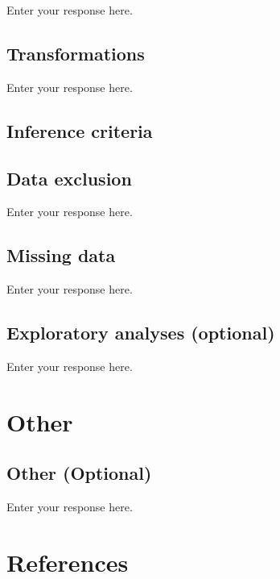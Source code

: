 \documentclass[]{article}
\begin{document}
Enter your response here.

\subsection{Transformations}\label{transformations}

Enter your response here.

\subsection{Inference criteria}\label{inference-criteria}

\subsection{Data exclusion}\label{data-exclusion}

Enter your response here.

\subsection{Missing data}\label{missing-data}

Enter your response here.

\subsection{Exploratory analyses
(optional)}\label{exploratory-analyses-optional}

Enter your response here.

\section{Other}\label{other}

\subsection{Other (Optional)}\label{other-optional}

Enter your response here.

\section{References}\label{references}

\subsection{}\label{section}

\vspace{-2pc}
\setlength{\parindent}{-0.5in}
\setlength{\leftskip}{-1in}
\setlength{\parskip}{8pt}

\noindent
\end{document}
